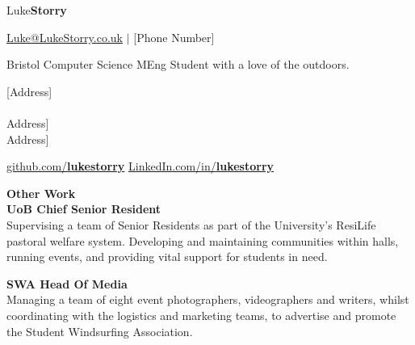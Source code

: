 \documentclass[10pt]{article}
\newcommand{\bold}[1]{\textbf{\textcolor{dark}{#1}}}
\newcommand{\sect}[1]{
\vspace{0.4em} {\LARGE\bold{#1}}\vspace{0.2em}\\}
\newcommand{\xx}[2]{{\large\bold{#1}}\\{#2}\vspace{0.5em}}
\begin{document}
\vspace{0.6em}

\begin{center}
{\color{dark}\Huge Luke\textbf{Storry}}
\hspace{0.1em}

{\large \href{mailto:Luke@LukeStorry.co.uk}{Luke@LukeStorry.co.uk}  $|$ [Phone Number]} 

Bristol Computer Science MEng Student with a love of the outdoors.\\
\vspace{-0.5em}
{\color{dark}\hrulefill}
\end{center}




\hspace{-1.5em}
\begin{minipage}[t]{0.34\textwidth}
\raggedright

\vspace{0.5em}

[Address]\\[Address]\\[]Address]\\[]Address]

\vspace{0.5em}

\href{https://github.com/lukestorry}{github.com/\bold{\textcolor{dark}{lukestorry}}}
\href{https://www.linkedin.com/in/lukestorry}{LinkedIn.com/in/\bold{lukestorry}} \\

\vspace{1.5em}

\sect{Other Work}
\xx{UoB Chief Senior Resident}
{Supervising a team of Senior Residents as part of the University's ResiLife pastoral welfare system. Developing and maintaining communities within halls, running events, and providing vital support for students in need.
}

\xx{SWA Head Of Media}
{Managing a team of eight event photographers, videographers and writers, whilst coordinating with the logistics and marketing teams, to advertise and promote the Student Windsurfing Association.
}


\end{minipage}
\end{document}

